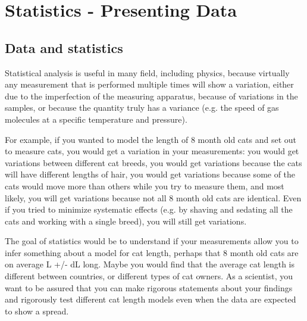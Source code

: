 %
\chapter{Statistics - Presenting Data}
\label{Chap:statData}
\section{Data and statistics}

Statistical analysis is useful in many field, including physics, because virtually any measurement that is performed multiple times will show a variation, either due to the imperfection of the measuring apparatus, because of variations in the samples, or because the quantity truly has a variance (e.g. the speed of gas molecules at a specific temperature and pressure).

For example, if you wanted to model the length of 8 month old cats and set out to measure cats, you would get a variation in your measurements: you would get variations between different cat breeds, you would get variations because the cats will have different lengths of hair, you would get variations because some of the cats would move more than others while you try to measure them, and most likely, you will get variations because not all 8 month old cats are identical. Even if you tried to minimize systematic effects (e.g. by shaving and sedating all the cats and working with a single breed), you will still get variations. 

The goal of statistics would be to understand if your measurements allow you to infer something about a model for cat length, perhaps that 8 month old cats are on average L +/- dL long. Maybe you would find that the average cat length is different between countries, or different types of cat owners. As a scientist, you want to be assured that you can make rigorous statements about your findings and rigorously test different cat length models even when the data are expected to show a spread.

